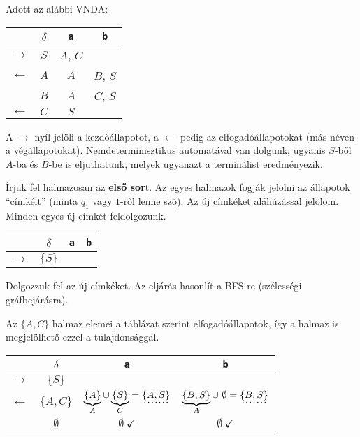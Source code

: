 \documentclass[a4paper,11pt]{article}
\begin{document}
Adott az alábbi VNDA:
\begin{center}
	\setlength{\tabcolsep}{0.5em} %
	{\renewcommand{\arraystretch}{1.5}%
	\begin{tabular}{cc||c|c}
		& $\delta$ & \texttt{a} & \texttt{b} \\
		\hline
		$\rightarrow$ & $S$ & $A$, $C$ &  \\
		$\leftarrow$ & $A$ & $A$ & $B$, $S$ \\
		& $B$ & $A$ & $C$, $S$ \\
		$\leftarrow$ & $C$ & $S$ &  \\
	\end{tabular}
	}
\end{center}

A $\rightarrow$ nyíl jelöli a kezdőállapotot, a $\leftarrow$ pedig az elfogadóállapotokat (más néven a végállapotokat). Nemdeterminisztikus automatával van dolgunk, ugyanis $S$-ből $A$-ba és $B$-be is eljuthatunk, melyek ugyanazt a terminálist eredményezik.

Írjuk fel halmazosan az \textbf{első sor}t. Az egyes halmazok fogják jelölni az állapotok ``címkéit'' (minta $q_1$ vagy $1$-ről lenne szó). Az új címkéket aláhúzással jelölöm. Minden egyes új címkét feldolgozunk.

\begin{center}
	\setlength{\tabcolsep}{0.5em} %
	{\renewcommand{\arraystretch}{1.5}%
	\begin{tabular}{cc||c|c}
		& $\delta$ & \texttt{a} & \texttt{b} \\
		\hline
		$\rightarrow$ & $\{S\}$ & \dotuline{$\{A, C\}$} & \dotuline{$\emptyset$}
	\end{tabular}
	}
\end{center}

Dolgozzuk fel az új címkéket. Az eljárás hasonlít a BFS-re (szélességi gráfbejárásra).

Az $\{A,C\}$ halmaz elemei a táblázat szerint elfogadóállapotok, így a halmaz is megjelölhető ezzel a tulajdonsággal.

\begin{center}
	\setlength{\tabcolsep}{0.5em} %
	{\renewcommand{\arraystretch}{1.5}%
		\begin{tabular}{cc||c|c}
			& $\delta$ & \texttt{a} & \texttt{b} \\
			\hline
			$\rightarrow$ & $\{S\}$ & \dotuline{$\{A, C\}$} & \dotuline{$\emptyset$} \\
			\hline
			$\leftarrow$ & $\{A, C\}$ & $\underbrace{\{A\}}_{A} \cup \underbrace{\{S\}}_C = \dotuline{\{A, S\}}$ & $\underbrace{\{B,S\}}_A \cup ~ \emptyset = \dotuline{\{ B,S \}}$ \\
			\hline
			& $ \emptyset$ & $\emptyset ~ \checkmark$ & $\emptyset ~ \checkmark$
		\end{tabular}
	}
\end{center}
\end{document}
